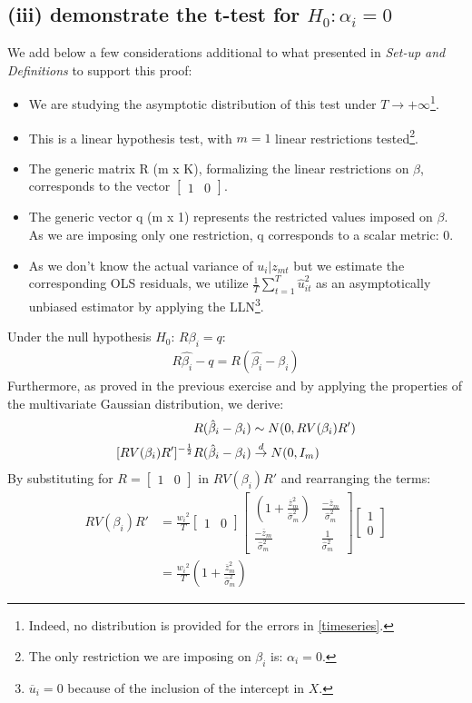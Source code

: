 \documentclass[]{article}
\begin{document}
\subsection{(iii) demonstrate the t-test for $H_0: \alpha_i=0$}
We add below a few considerations additional to what presented in \textit{Set-up and Definitions} to support this proof:
\begin{itemize}
	\item We are studying the asymptotic distribution of this test under $T \to +\infty$\footnote{Indeed, no distribution is provided for the errors in \ref{timeseries}.}.	
	\item This is a linear hypothesis test, with $m = 1$ linear restrictions tested\footnote{The only restriction we are imposing on $\beta_i$ is: $\alpha_i = 0 $.}.
	\item The generic matrix R (m x K), formalizing the linear restrictions on $\beta$, corresponds to the vector $\begin{bmatrix} 1 & 0 \end{bmatrix}$.
	\item The generic vector q (m x 1) represents the restricted values imposed on $\beta$. As we are imposing only one restriction, q corresponds to a scalar metric: 0.
	\item As we don't know the actual variance of $u_i|z_{mt}$ but we estimate the corresponding OLS residuals, we utilize $\frac{1}{T}\sum_{t=1}^{T}\hat{u}_{it}^2$ as an asymptotically unbiased estimator by applying the LLN\footnote{$\overline{u}_i = 0$ because of the inclusion of the intercept in $X$.}.
\end{itemize}
Under the null hypothesis $H_0$: $R\beta_i=q$:
\begin{align*}
	R\hat{\beta_i}-q = R(\hat{\beta_i} - \beta_i)
\end{align*}
Furthermore, as proved in the previous exercise and by applying the properties of the multivariate Gaussian distribution, we derive:
\begin{align} \label{2.3}
	R(\hat{\beta}_i-\beta_i) &\sim N(0, RV(\beta_i)R') \notag \\
	[RV(\beta_i)R']^{-\frac{1}{2}}R(\hat{\beta}_i-\beta_i) &\overset{d}{\to} N(0,I_m)
\end{align}
By substituting for $R=\begin{bmatrix} 1 & 0 \end{bmatrix}$ in $RV(\beta_i)R'$ and rearranging the terms:
\begin{align*}
	RV(\beta_i)R' &= \frac{w_i{^2}}{T} \begin{bmatrix} 1 & 0 \end{bmatrix} \begin{bmatrix} (1 + \frac{\overline{z}_m^2}{\hat{\sigma}_{m}^2}) & \frac{-\overline{z}_m}{\hat{\sigma}_{m}^2} \\ \frac{-\overline{z}_m}{\hat{\sigma}_{m}^2} & \frac{1}{\hat{\sigma}_{m}^2} \end{bmatrix} \begin{bmatrix} 1 \\ 0 \end{bmatrix} \\
	&= \frac{w_i{^2}}{T}(1 + \frac{\overline{z}_m^2}{\hat{\sigma}_{m}^2})
\end{align*}
\end{document}
